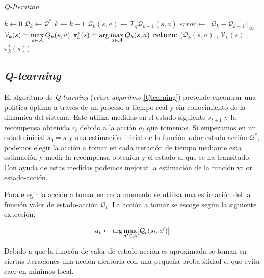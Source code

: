 \begin{algorithm}[!ht]
    \caption{\emph{Q-Iteration}}\label{QIteration}
    \begin{algorithmic}[1]
        \State $k \gets 0$
        \State $\mathcal{Q}_k\gets \mathcal{Q}^*$
            \State $k \gets k + 1$
                \State $\mathcal{Q}_k(s,a) \gets \mathcal{T}_q \mathcal{Q}_{k-1}(s,a)$
            \EndFor
            \State $error \gets || \mathcal{Q}_k - \mathcal{Q}_{k-1}||_\infty$
        \EndWhile
        \State $ \displaystyle \mathcal{V}_k(s) = \max_{a\in \mathcal{A}} Q_k(s,a)$
        \State $ \displaystyle \pi_k^*(s) = \arg \max_{a\in \mathcal{A}} Q_k(s,a)$
        \State \textbf{return}: ($\mathcal{Q}_k(s,a)$ , $\mathcal{V}_k(s)$ , $\pi_k^*(s)$)
        \EndProcedure
    \end{algorithmic}
\end{algorithm}



\subsection*{\emph{Q-learning}}


                                               
El algoritmo de \emph{Q-learning} (\emph{véase algoritmo }\ref{Qlearning}) pretende encontrar una política óptima a través de un proceso a tiempo real y sin conocimiento de la dinámica del sistema. Este utiliza medidas en el estado siguiente $s_{t+1}$ y la recompensa obtenida $r_t$ debido a la acción $a_t$ que tomemos. Si empezamos en un estado inicial $s_0 = s$ y una estimación inicial de la función valor estado-acción $\mathcal{Q}^*$,  podemos elegir la acción a tomar en cada iteración de tiempo mediante esta estimación y medir la recompensa obtenida y el estado al que se ha transitado. Con ayuda de estas medidas podemos mejorar la estimación de la función valor estado-acción.

Para elegir la acción a tomar en cada momento se utiliza una estimación del la función valor de estado-acción $\mathcal{Q}_t$. La acción a tomar se escoge según la siguiente expresión:

\begin{gather}
      a_t \leftarrow \arg \max_{a'\in \mathcal{A}} [\mathcal{Q}_t(s_t,a') ]
\end{gather}

Debido a que la función de valor de estado-acción es aproximada se toman en ciertas iteraciones una acción aleatoria con una pequeña probabilidad $\epsilon$, que evita caer en minimos local. 


